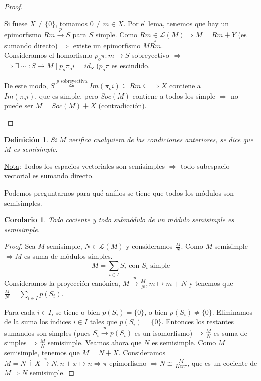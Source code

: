 \documentclass[11pt,a4paper]{article}
\theoremstyle{break}
\newtheorem{corollary}[theorem]{Corolario}
\newtheorem{definition}[theorem]{Definición}
\begin{document}
\begin{proof}
\begin{enumerate}
Si fuese $X \neq \{0\}$, tomamos $0 \neq m \in X$. Por el lema, tenemos que hay un epimorfismo $Rm \overset{p}{\to} S$ para $S$ simple. Como $Rm \in \mathcal{L}(M) \Rightarrow M = Rm \dotplus Y$ (es sumando directo) $\Rightarrow$ existe un epimorfismo $M \overset{\pi}{Rm}$. \\
Consideramos el homorfismo $p_{o}\pi: m \to S$ sobreyectivo $\Rightarrow$ \\ $\Rightarrow \exists \sim: S \to M \mid p_{o}\pi_{o}i = id_{S}$ ($p_{o}\pi$ es escindido.

De este modo, $S \overset{p \text{ sobreyectiva}}{\cong} Im(\pi_{o}i) \subseteq Rm \subseteq \Rightarrow X$ contiene a \\ $Im(\pi_{o}i)$, que es simple, pero $Soc(M)$ contiene a todos los simple $\Rightarrow$ no puede ser $M = Soc(M) \dotplus X$ (contradicción). 
\end{enumerate}
\end{proof}

\begin{definition}
Si $M$ verifica cualquiera de las condiciones anteriores, se dice que $M$ es semisimple.
\end{definition}


\underline{Nota}: Todos los espacios vectoriales son semisimples $\Rightarrow$ todo subespacio vectorial es sumando directo.

Podemos preguntarnos para qué anillos se tiene que todos los módulos son semisimples.

\begin{corollary}
Todo cociente y todo submódulo de un módulo semisimple es semisimple.
\end{corollary}

\begin{proof}
Sea $M$ semisimple, $N \in \mathcal{L}(M)$ y consideramos $\frac{M}{N}$. Como $M$ semisimple $\Rightarrow M$ es suma de módulos simples.
$$M = \sum_{i \in I} S_{i} \text{ con } S_{i} \text{ simple}$$
Consideramos la proyección canónica, $M \overset{p}{\to} \frac{M}{N}, m \mapsto m + N$ y tenemos que $\frac{M}{N} = \sum_{i \in I} p(S_{i})$.

Para cada $i \in I$, se tiene o bien $p(S_{i}) = \{0\}$, o bien $p(S_{i}) \neq \{0\}$. Eliminamos de la suma los índices $i \in I$ tales que $p(S_{i}) = \{0\}$. Entonces los restantes sumandos son simples (pues $S_{i} \overset{p}{\to} p(S_{i})$ es un isomorfismo) $\Rightarrow \frac{M}{N}$ es suma de simples $\Rightarrow \frac{M}{N}$ semisimple. Veamos ahora que $N$ es semisimple. Como $M$ semisimple, tenemos que $M = N \dotplus X$. Consideramos $M = N \dotplus X \overset{\pi}{\to} N, n+x \mapsto n \Rightarrow \pi$ epimorfismo $\Rightarrow N \cong \frac{M}{Ker \pi}$, que es un cociente de $M \Rightarrow N$ semisimple.
\end{proof}
\end{document}

